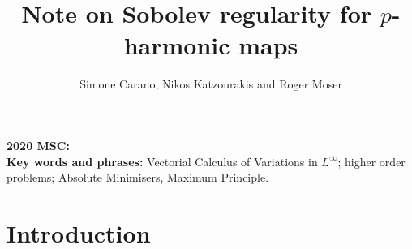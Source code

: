 \documentclass[a4paper,11pt]{article}
\title{Note on Sobolev regularity for $p$-harmonic maps
}
\author{
Simone Carano, Nikos Katzourakis and Roger Moser}
\numberwithin{equation}{section}
\theoremstyle{definition}
\begin{document}
\maketitle

\begin{abstract} 

\end{abstract}
{\bf 2020 MSC:}\\
{\bf Key words and phrases:} Vectorial Calculus of Variations in $L^\infty$; higher order problems; Absolute Minimisers, Maximum Principle.

\section{Introduction}\label{sec:introduction}
\end{document}
